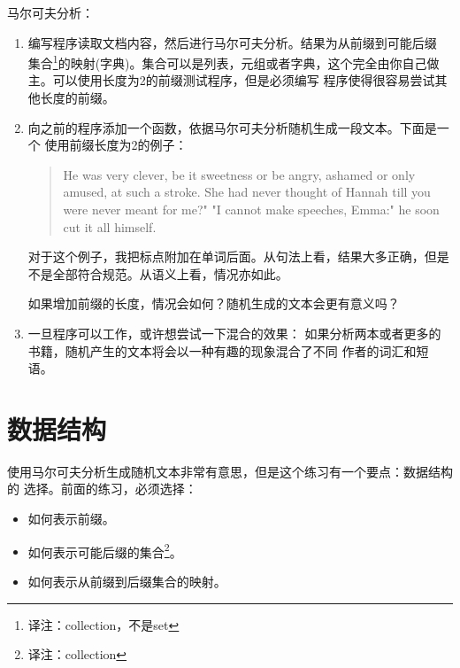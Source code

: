\begin{ex}
马尔可夫分析：

\begin{enumerate}

\item
编写程序读取文档内容，然后进行马尔可夫分析。结果为从前缀到可能后缀
集合\footnote{译注：collection，不是set}的映射(字典)。集合可以是列表，元组或者字典，这个完全由你自己做主。可以使用长度为2的前缀测试程序，但是必须编写
程序使得很容易尝试其他长度的前缀。

\item 向之前的程序添加一个函数，依据马尔可夫分析随机生成一段文本。下面是一个
使用前缀长度为2的例子：

\begin{quote}
He was very clever, be it sweetness or be angry, ashamed or only
amused, at such a stroke. She had never thought of Hannah till you
were never meant for me?" "I cannot make speeches, Emma:" he soon cut
it all himself.
\end{quote}

对于这个例子，我把标点附加在单词后面。从句法上看，结果大多正确，但是不是全部符合规范。从语义上看，情况亦如此。

如果增加前缀的长度，情况会如何？随机生成的文本会更有意义吗？


\item 一旦程序可以工作，或许想尝试一下混合的效果：
如果分析两本或者更多的书籍，随机产生的文本将会以一种有趣的现象混合了不同
作者的词汇和短语。

\end{enumerate}
\end{ex}

\section{数据结构}


使用马尔可夫分析生成随机文本非常有意思，但是这个练习有一个要点：数据结构的
选择。前面的练习，必须选择：

\begin{itemize}

\item 如何表示前缀。
\item 如何表示可能后缀的集合\footnote{译注：collection}。
\item 如何表示从前缀到后缀集合的映射。
\end{itemize}

